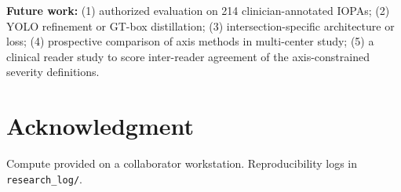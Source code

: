 \documentclass[conference]{IEEEtran}
\begin{document}
\textbf{Future work:} (1) authorized evaluation on 214 clinician-annotated IOPAs; (2) YOLO refinement or GT-box distillation; (3) intersection-specific architecture or loss; (4) prospective comparison of axis methods in multi-center study; (5) a clinical reader study to score inter-reader agreement of the axis-constrained severity definitions.

\section*{Acknowledgment}
Compute provided on a collaborator workstation. Reproducibility logs in \texttt{research\_log/}.



\end{document}
